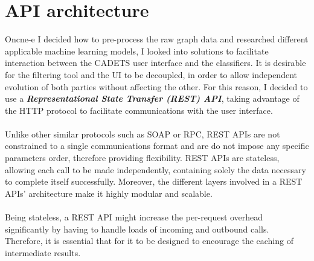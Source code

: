 	\section{API architecture} \label{Section 2.3}
	Oncne-e I decided how to pre-process the raw graph data and researched different applicable machine learning models, I looked into solutions to facilitate interaction between the CADETS user interface and the classifiers. It is desirable for the filtering tool and the UI to be decoupled, in order to allow independent evolution of both parties without affecting the other. For this reason, I decided to use a \textit{\textbf{Representational State Transfer (REST) API}}, taking advantage of the HTTP protocol to facilitate communications with the user interface.
	\\ \\
	Unlike other similar protocols such as SOAP or RPC, REST APIs are not constrained to a single communications format and are do not impose any specific parameters order, therefore providing flexibility. REST APIs are stateless, allowing each call to be made independently, containing solely the data necessary to complete itself successfully. Moreover, the different layers involved in a REST APIs' architecture make it highly modular and scalable. 
	\\ \\
	Being stateless, a REST API might increase the per-request overhead significantly by having to handle loads of incoming and outbound calls. Therefore, it is essential that for it to be designed to encourage the caching of intermediate results.
